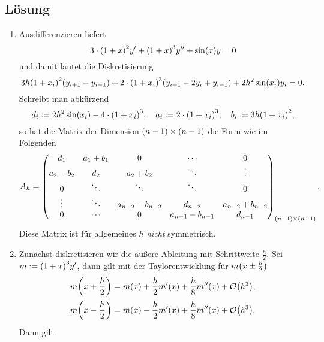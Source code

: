 \documentclass{exercise}
\begin{document}
    \subsection*{Lösung}
    \begin{enumerate}
        \item Ausdifferenzieren liefert
        \[
            3 \cdot \parentheses*{1 + x}^2 y' + \parentheses*{1 + x}^3 y'' + \sin\parentheses*{x}y = 0
        \]
        und damit lautet die Diskretisierung
        \[
            3h\parentheses*{1 + x_i}^2 \parentheses*{y_{i + 1} - y_{i - 1}} + 2 \cdot \parentheses*{1 + x_i}^3 \parentheses*{y_{i + 1} - 2y_i + y_{i - 1}} + 2h^2 \sin\parentheses*{x_i}y_i = 0.
        \]
        Schreibt man abkürzend
        \[
            d_i := 2h^2 \sin\parentheses*{x_i} - 4 \cdot \parentheses*{1 + x_i}^3, \quad a_i := 2 \cdot \parentheses*{1 + x_i}^3, \quad b_i := 3h\parentheses*{1 + x_i}^2,
        \]
        so hat die Matrix der Dimension \(\parentheses*{n - 1} \times \parentheses*{n - 1}\) die Form wie im Folgenden
        \[
            A_h = \begin{pmatrix}
                d_1 & a_1 + b_1 & 0 & \cdots & 0\\
                a_2 - b_2 & d_2 & a_2 + b_2 & \ddots & \vdots\\
                0 & \ddots & \ddots & \ddots & 0\\
                \vdots & \ddots & a_{n - 2} - b_{n - 2} & d_{n - 2} & a_{n - 2} + b_{n - 2}\\
                0 & \cdots & 0 & a_{n - 1} - b_{n - 1} & d_{n - 1}
            \end{pmatrix}_{\parentheses*{n - 1} \times \parentheses*{n - 1}}.
        \]
        Diese Matrix ist für allgemeines \(h\) \emph{nicht} symmetrisch.
        \item Zunächst diskretisieren wir die äußere Ableitung mit Schrittweite \(\frac{h}{2}\).
        Sei \(m := \parentheses*{1 + x}^3 y'\), dann gilt mit der Taylorentwicklung für \(m\parentheses*{x \pm \frac{h}{2}}\)
        \begin{align*}
            m\parentheses*{x + \frac{h}{2}} &= m\parentheses*{x} + \frac{h}{2}m'\parentheses*{x} + \frac{h}{8}m''\parentheses*{x} + \mathcal{O}\parentheses*{h^3},\\
            m\parentheses*{x - \frac{h}{2}} &= m\parentheses*{x} - \frac{h}{2}m'\parentheses*{x} + \frac{h}{8}m''\parentheses*{x} + \mathcal{O}\parentheses*{h^3}.
        \end{align*}
        Dann gilt

\end{enumerate}
\end{document}
